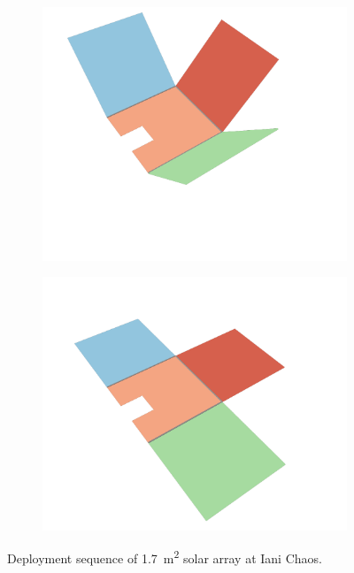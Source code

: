 \begin{figure}[h]
\begin{subfigure}[t]{\subfigureWidth}
		\includegraphics[height=\graphicsHeight]{sections/design/solar-array/images/deployment/iani-chaos/solar_array_deployment_iani_chaos_030.png}
		\label{fig:sub:deployment-sequence-iani-chaos-mid}
	\end{subfigure}\hfill
    \begin{subfigure}[t]{\subfigureWidth}
        \centering
		\includegraphics[height=\graphicsHeight]{sections/design/solar-array/images/deployment/iani-chaos/solar_array_deployment_iani_chaos_060.png}
		\label{fig:sub:deployment-sequence-iani-completed}
	\end{subfigure}
	\caption{Deployment sequence of \SI{1.7}{\meter\squared} solar array at Iani Chaos.}
	\label{fig:deployment-sequence-iani-chaos}
\vspace{-2ex}
\end{figure}

